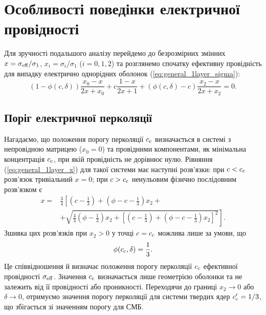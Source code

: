 \documentclass[14pt,twoside]{vakthesis}
\begin{document}
\section{Особливості поведінки електричної провідності}

Для зручності подальшого аналізу перейдемо до безрозмірних змінних $x = \sigma_{\rm eff}/\sigma_1$, $x_i = \sigma_i/\sigma_1$ ($i = 0,1,2$) та розглянемо спочатку ефективну провідність для випадку електрично однорідних оболонок (\ref{eq:general_1layer_sigma}): 
\begin{equation}\label{eq:general_1layer_x}
	(1 - \phi(c,\delta)) \frac{x_0 - x}{2x + x_0}
	+ c \frac{1 - x}{2x + 1}
	+ (\phi(c,\delta) - c) \frac{x_2 - x}{2x + x_2} = 0.
\end{equation}

\subsection{Поріг електричної перколяції}\label{sec:perc-analysis-threshold}
Нагадаємо, що положення порогу перколяції $c_{\rm c}$ визначається в системі з непровідною матрицею ($x_0=0$) та провідними компонентами, як мінімальна концентрація $c_{\rm c}$, при якій провідність не дорівнює нулю. Рівняння (\ref{eq:general_1layer_x}) для такої системи має наступні розв'язки: при $c<c_{\rm c}$ розв'язок тривіальний $x = 0$; при $c > c_{\rm c}$ ненульовим фізично послідовним розв'язком є
\begin{equation}\label{eq:general_1layer_x_x00}
\begin{split}
x =& \frac{3}{4} \left[ \left( c - \frac{1}{3} \right) 
+ \left( \phi - c - \frac{1}{3} \right)x_2 + \right. \\
&\left. + \sqrt{\frac{4}{3} \left( \phi - \frac{1}{3} \right)x_2 + \left[ \left( c - \frac{1}{3} \right) + \left( \phi - c  - \frac{1}{3} \right)x_2 \right]^2} \right].
\end{split}
\end{equation}
Зшивка цих розв'язків при $x_2 > 0$ у точці $c=c_{\rm c}$ можлива лише за умови, що
\begin{equation}\label{eq:threshold}
\phi(c_{\rm c}, \delta) = \frac{1}{3}.
\end{equation}
Це співвідношення й визначає положення порогу перколяції $c_{\rm c}$ ефективної провідності $\sigma_{\rm eff}$. Значення $c_{\rm c}$ визначається лише геометрією оболонки та не залежить від її провідності або проникності. Переходячи до границі $x_2 \to 0$ або $\delta \to 0$, отримуємо значення порогу перколяції для системи твердих ядер $c'_{\rm c} = 1/3$, що збігається зі значенням порогу для СМБ.
\end{document}
